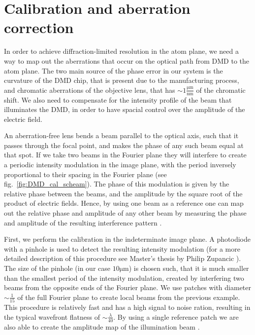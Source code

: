 \section{Calibration and aberration correction}
In order to achieve diffraction-limited resolution in the atom plane, we need a way to map out the aberrations that occur on the optical path from DMD to the atom plane. The two main source of the phase error in our system is the curvature of the DMD chip, that is present due to the manufacturing process, and chromatic aberrations of the objective lens, that has $\sim 1 \frac{\mathrm{\mu m}}{\mathrm{nm}} $ of the chromatic shift. We also need to compensate for the intensity profile of the beam that illuminates the DMD, in order to have spacial control over the amplitude of the electric field.

An aberration-free lens bends a beam parallel to the optical axis, such that it passes through the focal point, and makes the phase of any such beam equal at that spot. If we take two beams in the Fourier plane they will interfere to create a periodic intensity modulation in the image plane, with the period inversely proportional to their spacing in the Fourier plane (see fig.~\ref{fig:DMD_cal_scheam}). The phase of this modulation is given by the relative phase between the beams, and the amplitude by the square root of the product of electric fields. Hence, by using one beam as a reference one can map out the relative phase and amplitude of any other beam by measuring the phase and amplitude of the resulting interference pattern \cite{Zupancic2016}.

First, we perform the calibration in the indeterminate image plane. A photodiode with a pinhole is used to detect the resulting intensity modulation (for a more detailed description of this procedure see Master’s thesis by Philip Zupancic \cite{Zupancic thesis}). The size of the pinhole (in our case $10 \mathrm{\mu m}$) is chosen such, that it is much smaller than the smallest period of the intensity modulation, created by interfering two beams from the opposite ends of the Fourier plane. We use patches with diameter $\sim \frac{1}{15}$ of the full Fourier plane to create local beams from the previous example. This procedure is relatively fast and has a high signal to noise ration, resulting in the typical wavefront flatness of $\sim \frac{\lambda}{40}$. By using a single reference patch we are also able to create the amplitude map of the illumination beam \cite{Zupancic2016}.  

